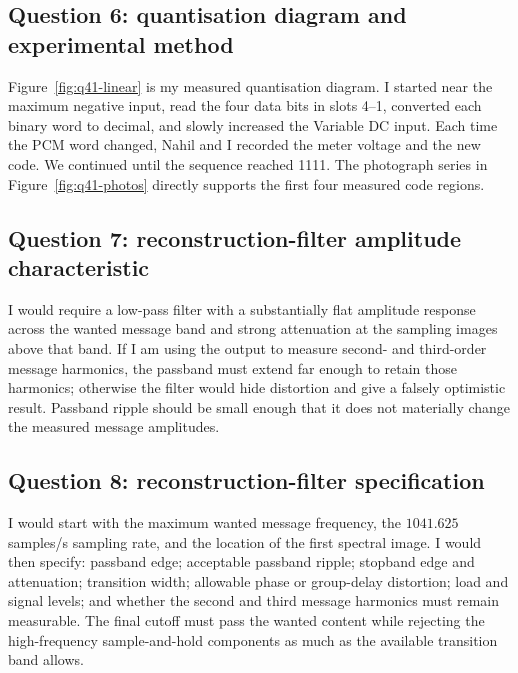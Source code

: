 \documentclass[11pt,a4paper]{article}
\begin{document}
\subsection{Question 6: quantisation diagram and experimental method}
\begin{answerbox}
Figure~\ref{fig:q41-linear} is my measured quantisation diagram. I started near the maximum negative input, read the four data bits in slots 4--1, converted each binary word to decimal, and slowly increased the Variable DC input. Each time the PCM word changed, Nahil and I recorded the meter voltage and the new code. We continued until the sequence reached 1111. The photograph series in Figure~\ref{fig:q41-photos} directly supports the first four measured code regions.
\end{answerbox}

\subsection{Question 7: reconstruction-filter amplitude characteristic}
\begin{answerbox}
I would require a low-pass filter with a substantially flat amplitude response across the wanted message band and strong attenuation at the sampling images above that band. If I am using the output to measure second- and third-order message harmonics, the passband must extend far enough to retain those harmonics; otherwise the filter would hide distortion and give a falsely optimistic result. Passband ripple should be small enough that it does not materially change the measured message amplitudes.
\end{answerbox}

\subsection{Question 8: reconstruction-filter specification}
\begin{answerbox}
I would start with the maximum wanted message frequency, the $1041.625$ samples/s sampling rate, and the location of the first spectral image. I would then specify: passband edge; acceptable passband ripple; stopband edge and attenuation; transition width; allowable phase or group-delay distortion; load and signal levels; and whether the second and third message harmonics must remain measurable. The final cutoff must pass the wanted content while rejecting the high-frequency sample-and-hold components as much as the available transition band allows.
\end{answerbox}
\end{document}
